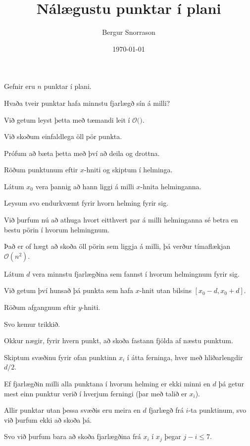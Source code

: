\title{Nálægustu punktar í plani}
\author{Bergur Snorrason}
\date{\today}



\frame{\titlepage}

{
	{
		\item<1-> Gefnir eru $n$ punktar í plani.
		\item<2-> Hvaða tveir punktar hafa minnstu fjarlægð sín á milli?
		\item<3-> Við getum leyst þetta með tæmandi leit í $\mathcal{O}($\onslide<4->{$n^2$}$)$.
		\item<5-> Við skoðum einfaldlega öll pör punkta.
		\item<6-> Prófum að bæta þetta með því að deila og drottna.
	}
}

{
	{
		\item<1-> Röðum punktunum eftir $x$-hniti og skiptum í helminga.
		\item<2-> Látum $x_0$ vera þannig að hann liggi á milli $x$-hnita helminganna.
		\item<3-> Leysum svo endurkvæmt fyrir hvorn helming fyrir sig.
		\item<4-> Við þurfum nú að athuga hvort eitthvert par á milli helminganna sé betra en
					bestu pörin í hvorum helmingnum.
		\item<5-> Það er of hægt að skoða öll pörin sem liggja á milli, þá verður tímaflækjan $\mathcal{O}(n^2)$.
		\item<6-> Látum $d$ vera minnstu fjarlægðina sem fannst í hvorum helmingnum fyrir sig.
		\item<7-> Við getum því hunsað þá punkta sem hafa $x$-hnit utan bilsins $[x_0 - d, x_0 + d]$.
		\item<8-> Röðum afgangnum eftir $y$-hniti.
		\item<9-> Svo kemur trikkið.
		\item<10-> Okkur nægir, fyrir hvern punkt, að skoða fastann fjölda af næstu punktum.
	}
}

{
	{
		\item<1-> Skiptum svæðinu fyrir ofan punktinn $x_i$ í átta ferninga, hver með hliðarlengdir $d/2$.
		\item<2-> Ef fjarlægðin milli alla punktana í hvorum helming er ekki minni en $d$ þá getur mest einn punktur verið í hverjum ferningi
					(þar með talið er $x_i$).
		\item<3-> Allir punktar utan þessa svæðis eru meira en $d$ fjarlægð frá $i$-ta punktinum, svo við þurfum ekki að skoða þá.
		\item<4-> Svo við þurfum bara að skoða fjarlægðina frá $x_i$ í $x_j$ þegar $j - i \leq 7$.
	}
}

